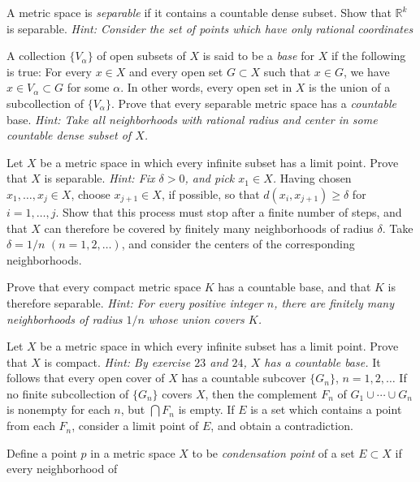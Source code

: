 \begin{exercise}
\item
  A metric space is \textit{separable} if it contains a countable dense subset.
  Show that \(\mathbb{R}^k\) is separable.
  \textit{Hint: Consider the set of points which have only rational
    coordinates}
\item
  A collection \(\{V_{\alpha}\}\) of open subsets of \(X\) is said to be a
  \textit{base} for \(X\) if the following is true: For every \(x\in X\) and
  every open set \(G\subset X\) such that \(x\in G\), we have
  \(x\in V_{\alpha}\subset G\) for some \(\alpha\).
  In other words, every open set in \(X\) is the union of a subcollection of
  \(\{V_{\alpha}\}\).
  Prove that every separable metric space has a \textit{countable} base.
  \textit{Hint: Take all neighborhoods with rational radius and center in some
    countable dense subset of \(X\).}
\item
  Let \(X\) be a metric space in which every infinite subset has a limit point.
  Prove that \(X\) is separable.
  \textit{Hint: Fix \(\delta > 0\), and pick \(x_1\in X\).}
  Having chosen \(x_1,\ldots,x_j\in X\), choose \(x_{j + 1}\in X\), if
  possible, so that \(d(x_i, x_{j + 1})\geq\delta\) for \(i = 1,\ldots,j\).
  Show that this process must stop after a finite number of steps, and that
  \(X\) can therefore be covered by finitely many neighborhoods of radius
  \(\delta\).
  Take \(\delta = 1/n\) \((n = 1,2,\ldots)\), and consider the centers of the
  corresponding neighborhoods.
\item
  Prove that every compact metric space \(K\) has a countable base, and that
  \(K\) is therefore separable.
  \textit{Hint: For every positive integer \(n\), there are finitely many
    neighborhoods of radius \(1/n\) whose union covers \(K\).}
\item
  Let \(X\) be a metric space in which every infinite subset has a limit point.
  Prove that \(X\) is compact.
  \textit{Hint: By exercise \(23\) and \(24\), \(X\) has a countable base.}
  It follows that every open cover of \(X\) has a countable subcover
  \(\{G_n\}\), \(n = 1,2,\ldots\)
  If no finite subcollection of \(\{G_n\}\) covers \(X\), then the complement
  \(F_n\) of \(G_1\cup\cdots\cup G_n\) is nonempty for each \(n\), but
  \(\bigcap F_n\) is empty.
  If \(E\) is a set which contains a point from each \(F_n\), consider a limit
  point of \(E\), and obtain a contradiction.
\item
  Define a point \(p\) in a metric space \(X\) to be
  \textit{condensation point} of a set \(E\subset X\) if every neighborhood of

\end{exercise}

